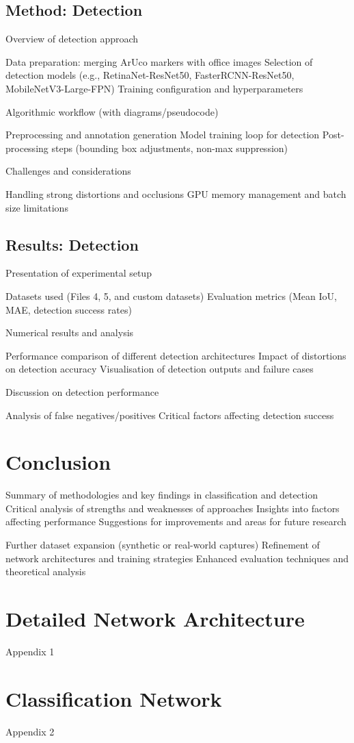 \documentclass[conference]{IEEEtran}
\begin{document}
\subsection{Method: Detection}

Overview of detection approach

Data preparation: merging ArUco markers with office images
Selection of detection models (e.g., RetinaNet-ResNet50, FasterRCNN-ResNet50, MobileNetV3-Large-FPN)
Training configuration and hyperparameters

Algorithmic workflow (with diagrams/pseudocode)

Preprocessing and annotation generation
Model training loop for detection
Post-processing steps (bounding box adjustments, non-max suppression)

Challenges and considerations

Handling strong distortions and occlusions
GPU memory management and batch size limitations

\subsection{Results: Detection}

Presentation of experimental setup

Datasets used (Files 4, 5, and custom datasets)
Evaluation metrics (Mean IoU, MAE, detection success rates)

Numerical results and analysis

Performance comparison of different detection architectures
Impact of distortions on detection accuracy
Visualisation of detection outputs and failure cases

Discussion on detection performance

Analysis of false negatives/positives
Critical factors affecting detection success

\section{Conclusion}

Summary of methodologies and key findings in classification and detection
Critical analysis of strengths and weaknesses of approaches
Insights into factors affecting performance
Suggestions for improvements and areas for future research

Further dataset expansion (synthetic or real-world captures)
Refinement of network architectures and training strategies
Enhanced evaluation techniques and theoretical analysis

\printbibsection

\appendices

\renewcommand{\thesection}{\Alph{section}}

\section{Detailed Network Architecture}

Appendix 1

\section{Classification Network}

Appendix 2
\end{document}
